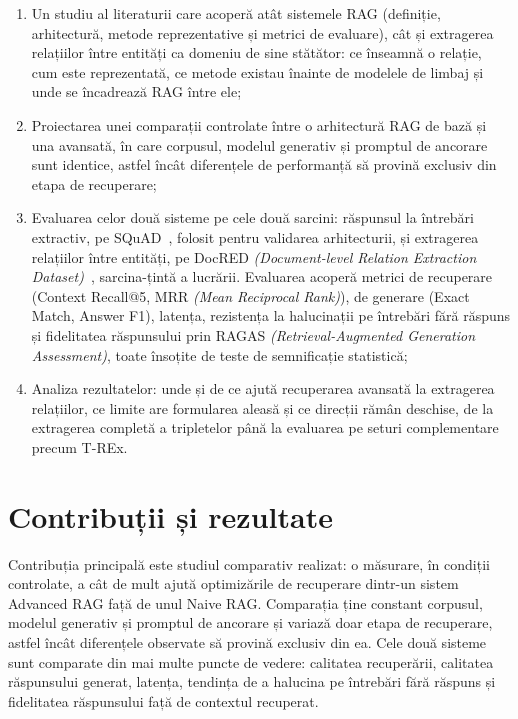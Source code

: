 \begin{enumerate}
    \item Un studiu al literaturii care acoperă atât sistemele RAG (definiție, arhitectură, metode reprezentative și metrici de evaluare), cât și extragerea relațiilor între entități ca domeniu de sine stătător: ce înseamnă o relație, cum este reprezentată, ce metode existau înainte de modelele de limbaj și unde se încadrează RAG între ele;
    \item Proiectarea unei comparații controlate între o arhitectură RAG de bază și una avansată, în care corpusul, modelul generativ și promptul de ancorare sunt identice, astfel încât diferențele de performanță să provină exclusiv din etapa de recuperare;
    \item Evaluarea celor două sisteme pe cele două sarcini: răspunsul la întrebări extractiv, pe SQuAD~\cite{rajpurkar-etal-2016-squad}, folosit pentru validarea arhitecturii, și extragerea relațiilor între entități, pe DocRED \textit{(Document-level Relation Extraction Dataset)}~\cite{yao2019docred}, sarcina-țintă a lucrării. Evaluarea acoperă metrici de recuperare (Context Recall@5, MRR \textit{(Mean Reciprocal Rank)}), de generare (Exact Match, Answer F1), latența, rezistența la halucinații pe întrebări fără răspuns și fidelitatea răspunsului prin RAGAS \textit{(Retrieval-Augmented Generation Assessment)}, toate însoțite de teste de semnificație statistică;
    \item Analiza rezultatelor: unde și de ce ajută recuperarea avansată la extragerea relațiilor, ce limite are formularea aleasă și ce direcții rămân deschise, de la extragerea completă a tripletelor până la evaluarea pe seturi complementare precum T-REx.
\end{enumerate}

\section*{Contribuții și rezultate}

Contribuția principală este studiul comparativ realizat: o măsurare, în condiții controlate, a cât de mult ajută optimizările de recuperare dintr-un sistem Advanced RAG față de unul Naive RAG. Comparația ține constant corpusul, modelul generativ și promptul de ancorare și variază doar etapa de recuperare, astfel încât diferențele observate să provină exclusiv din ea. Cele două sisteme sunt comparate din mai multe puncte de vedere: calitatea recuperării, calitatea răspunsului generat, latența, tendința de a halucina pe întrebări fără răspuns și fidelitatea răspunsului față de contextul recuperat.

